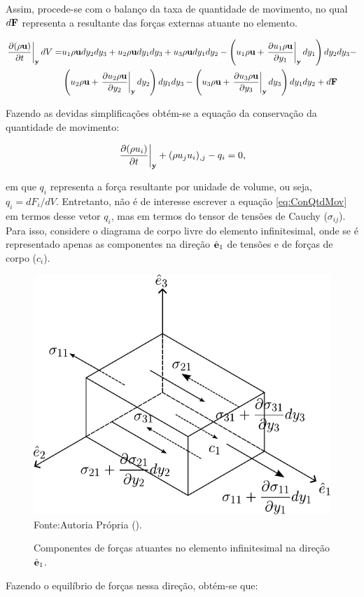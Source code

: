 Assim, procede-se com o balanço da taxa de quantidade de movimento, no qual $d\mathbf{F}$ representa a resultante das forças externas atuante no elemento.

\[
    \begin{split}
        \left.\frac{\partial{(\rho\mathbf{u})}}{\partial{t}}\right|_{\mathbf{y}}dV=&u_1\rho\mathbf{u}dy_2dy_3+u_2\rho\mathbf{u}dy_1dy_3+u_3\rho\mathbf{u}dy_1dy_2-\left(u_1\rho\mathbf{u}+\left.\frac{\partial{u_1\rho\mathbf{u}}}{\partial{y_1}}\right|_{\mathbf{y}}dy_1\right)dy_2dy_3-\\
        &\left(u_2\rho\mathbf{u}+\left.\frac{\partial{u_2\rho\mathbf{u}}}{\partial{y_2}}\right|_{\mathbf{y}}dy_2\right)dy_1dy_3-\left(u_3\rho\mathbf{u}+\left.\frac{\partial{u_3\rho\mathbf{u}}}{\partial{y_3}}\right|_{\mathbf{y}}dy_3\right)dy_1dy_2+d\mathbf{F}
    \end{split}
\]

Fazendo as devidas simplificações obtém-se a equação da conservação da quantidade de movimento:

\begin{equation}
    \left.\frac{\partial{(\rho u_i)}}{\partial{t}}\right|_{\mathbf{y}}+(\rho u_ju_i)_{,j}-q_i=0\text{,}
    \label{eq:ConQtdMov}
\end{equation}

\noindent em que $q_i$ representa a força resultante por unidade de volume, ou seja, $q_i=dF_i/dV$. Entretanto, não é de interesse escrever a equação \ref{eq:ConQtdMov} em termos desse vetor $q_i$, mas em termos do tensor de tensões de Cauchy ($\sigma_{ij}$). Para isso, considere o diagrama de corpo livre do elemento infinitesimal, onde se é representado apenas as componentes na direção $\hat{\mathbf{e}}_1$ de tensões e de forças de corpo ($c_i$).

\begin{figure}[h]
    \centering
    \caption{Componentes de forças atuantes no elemento infinitesimal na direção $\hat{\mathbf{e}}_1$.}
    \includegraphics[width=.5\linewidth]{Figuras/EqFor.pdf}
    \\Fonte:Autoria Própria (\the\year).
    \label{fig:EqFor}
\end{figure}

Fazendo o equilíbrio de forças nessa direção, obtém-se que:

